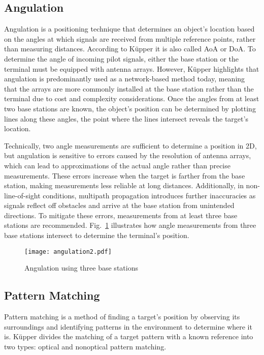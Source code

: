 \subsection{Angulation}
Angulation is a positioning technique that determines an object's location based on the angles at which signals are received from multiple reference points, rather than measuring distances. 
According to K\"upper \cite{kupper2005location} it is also called \ac{AoA} or \ac{DoA}. 
To determine the angle of incoming pilot signals, either the base station or the terminal must be equipped with antenna arrays.
However, K\"upper \cite{kupper2005location} highlights that angulation is predominantly used as a network-based method today, meaning that the arrays are more commonly installed at the base station rather than the terminal due to cost and complexity considerations.
Once the angles from at least two base stations are known, the object's position can be determined by plotting lines along these angles, the point where the lines intersect reveals the target's location. 

Technically, two angle measurements are sufficient to determine a position in 2D, but angulation is sensitive to errors caused by the resolution of antenna arrays, which can lead to approximations of the actual angle rather than precise measurements.
These errors increase when the target is farther from the base station, making measurements less reliable at long distances.
Additionally, in non-line-of-sight conditions, multipath propagation introduces further inaccuracies as signals reflect off obstacles and arrive at the base station from unintended directions. 
To mitigate these errors, measurements from at least three base stations are recommended.
Fig.~\ref{fig:angulation2} illustrates how angle measurements from three base stations intersect to determine the terminal's position.

\begin{figure}[htbp]
    \centering
    \texttt{[image: angulation2.pdf]}
    \caption{Angulation using three base stations \cite{militaru2024positioning}}
    \label{fig:angulation2}
\end{figure}

\subsection{Pattern Matching}
Pattern matching is a method of finding a target's position by observing its surroundings and identifying patterns in the environment to determine where it is.
K\"upper \cite{kupper2005location} divides the matching of a target pattern with a known reference into two types: optical and nonoptical pattern matching.

